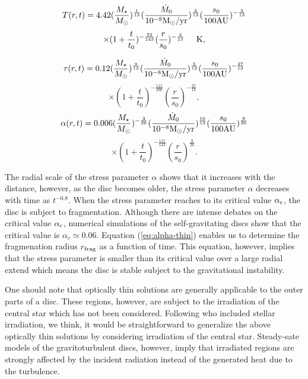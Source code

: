 \documentclass[apj]{emulateapj}
\begin{document}
\begin{displaymath}
T (r,t) = 4.42 (\frac{M_{\star}}{M_{\odot}})^{\frac{1}{13}} (\frac{\dot{M}_0}{10^{-8} {\rm M}_{\odot}/{\rm yr}})^{\frac{2}{13}} (\frac{s_0}{100 {\rm AU}})^{-\frac{3}{13}}
\end{displaymath}
%
\begin{equation}
\times (1+\frac{t}{t_0})^{-\frac{23}{143}} (\frac{r}{s_0})^{-\frac{3}{13}} \hspace{0.5cm} {\rm K},
\end{equation}


\begin{displaymath}
\tau (r,t) = 0.12 (\frac{M_{\star}}{M_{\odot}})^{\frac{9}{13}} (\frac{\dot{M}_0}{10^{-8} {\rm M}_{\odot}/{\rm yr}})^{\frac{5}{13}} (\frac{s_0}{100 {\rm AU}})^{-\frac{27}{13}}
\end{displaymath}
%
\begin{equation}
\times (1+\frac{t}{t_0})^{-\frac{115}{286}} (\frac{r}{s_0})^{-\frac{27}{13}},
\end{equation}
%
%
\begin{displaymath}
\alpha (r,t) = 0.006 (\frac{M_{\star}}{M_{\odot}})^{-\frac{3}{26}} (\frac{\dot{M}_0}{10^{-8} {\rm M}_{\odot}/{\rm yr}})^{\frac{10}{13}} (\frac{s_0}{100 {\rm AU}})^{\frac{9}{26}}
\end{displaymath}
%
\begin{equation}\label{eq:alpha-thin}
\times (1+\frac{t}{t_0})^{-\frac{115}{143}} (\frac{r}{s_0})^{\frac{9}{26}}.
\end{equation}


The radial scale of the stress parameter $\alpha$ shows that it increases with the distance, however, as the disc becomes older, the stress parameter $\alpha$ decreases with time  as $t^{-0.8}$. When the stress parameter reaches to its critical value $\alpha_{\rm c}$, the disc is subject to fragmentation. Although there are intense debates on the critical value $\alpha_{\rm c}$,  numerical simulations of the self-gravitating discs show that the critical value is $\alpha_c \simeq 0.06$. Equation (\ref{eq:alpha-thin}) enables us to determine the fragmenation radius $r_{\rm frag}$ as a function of time. This equation, however, implies that the stress parameter is smaller than its critical value over a large radial extend which means the disc is stable subject to the gravitational instability. 
%


One should note that optically thin solutions are generally applicable to the outer parts of a disc. These regions, however, are subject to the irradiation of the central star which has not been considered. Following \cite{chambers} who included stellar irradiation, we think, it would be straightforward to generalize the above optically thin solutions by considering irradiation of the central star. Steady-sate models of the gravitoturbulent discs, however, imply that irradiated regions are strongly affected by the incident radiation instead of the generated heat due to the turbulence.  
\end{document}
